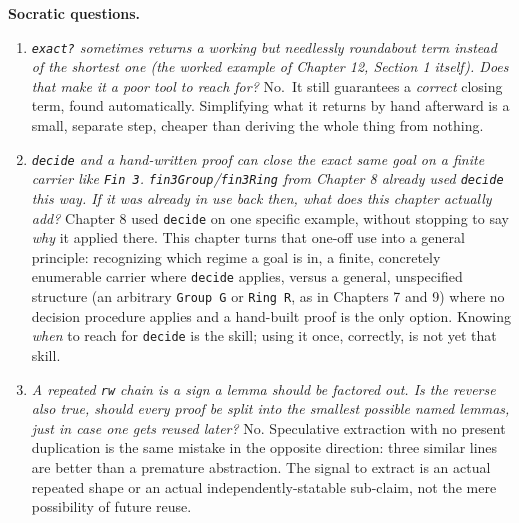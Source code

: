 \textbf{Socratic questions.}

\begin{enumerate}
\def\labelenumi{\arabic{enumi}.}
\tightlist
\item
  \emph{\texttt{exact?} sometimes returns a working but needlessly roundabout term instead of the shortest one (the worked example of Chapter 12, Section 1 itself). Does that make it a poor tool to reach for?} No.~It still guarantees a \emph{correct} closing term, found automatically. Simplifying what it returns by hand afterward is a small, separate step, cheaper than deriving the whole thing from nothing.
\item
  \emph{\texttt{decide} and a hand-written proof can close the exact same goal on a finite carrier like \texttt{Fin 3}. \texttt{fin3Group}/\texttt{fin3Ring} from Chapter 8 already used \texttt{decide} this way. If it was already in use back then, what does this chapter actually add?} Chapter 8 used \texttt{decide} on one specific example, without stopping to say \emph{why} it applied there. This chapter turns that one-off use into a general principle: recognizing which regime a goal is in, a finite, concretely enumerable carrier where \texttt{decide} applies, versus a general, unspecified structure (an arbitrary \texttt{Group G} or \texttt{Ring R}, as in Chapters 7 and 9) where no decision procedure applies and a hand-built proof is the only option. Knowing \emph{when} to reach for \texttt{decide} is the skill; using it once, correctly, is not yet that skill.
\item
  \emph{A repeated \texttt{rw} chain is a sign a lemma should be factored out. Is the reverse also true, should every proof be split into the smallest possible named lemmas, just in case one gets reused later?} No. Speculative extraction with no present duplication is the same mistake in the opposite direction: three similar lines are better than a premature abstraction. The signal to extract is an actual repeated shape or an actual independently-statable sub-claim, not the mere possibility of future reuse.
\end{enumerate}


